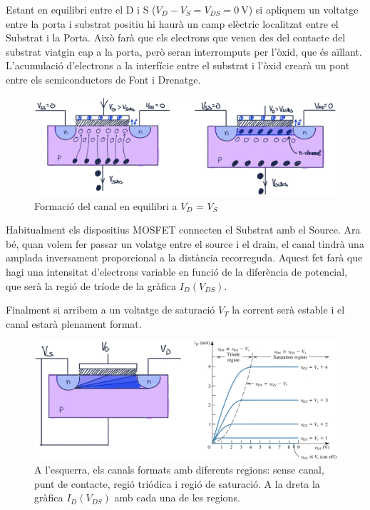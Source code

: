 \documentclass[11pt,a4paper]{article}
\begin{document}
Estant en equilibri entre el D i S ($V_D - V_S = V_{DS} = \qty{0}{\volt}$) si apliquem un voltatge entre la porta i substrat positiu hi haurà un camp elèctric localitzat entre el Substrat i la Porta. Això farà que els electrons que venen des del contacte del substrat viatgin cap a la porta, però seran interromputs per l'òxid, que és aïllant. L'acumulació d'electrons a la interfície entre el substrat i l'òxid crearà un pont entre els semiconductors de Font i Drenatge.


\begin{figure}[h]
    \centering
    \includegraphics[width=0.6\paperwidth]{images/nmos23.png}
    \caption{Formació del canal en equilibri a $V_D$ = $V_S$}
    \label{fig:nmos23}
\end{figure}

Habitualment els dispositius MOSFET connecten el Substrat amb el Source. Ara bé, quan volem fer passar un volatge entre el source i el drain, el canal tindrà una amplada inversament proporcional a la distància recorreguda. Aquest fet farà que hagi una intensitat d'electrons variable en funció de la diferència de potencial, que serà la regió de tríode de la gràfica $I_D(V_{DS})$. 

Finalment si arribem a un voltatge de saturació $V_T$ la corrent serà estable i el canal estarà plenament format.

\begin{figure}[h]
    \centering
    \includegraphics[width=0.6\paperwidth]{images/nmos idvds.png}
    \caption{A l'esquerra, els canals formats amb diferents regions: sense canal, punt de contacte, regió triódica i regió de saturació. A la dreta la gràfica $I_D(V_{DS})$ amb cada una de les regions.}
    \label{fig:nmos23}
\end{figure}
\end{document}
